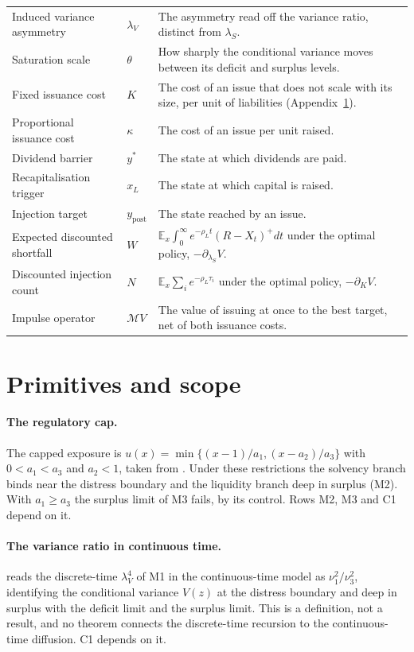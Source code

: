 \begin{longtable}{@{}P{3.4cm}P{4.2cm}P{8.6cm}@{}}
Induced variance asymmetry & $\lambda_V$ & The asymmetry read off the variance ratio, distinct from $\lambda_S$. \\
Saturation scale & $\theta$ & How sharply the conditional variance moves between its deficit and surplus levels. \\
Fixed issuance cost & $K$ & The cost of an issue that does not scale with its size, per unit of liabilities (Appendix~\ref{app:primitives}). \\
Proportional issuance cost & $\kappa$ & The cost of an issue per unit raised. \\
Dividend barrier & $y^*$ & The state at which dividends are paid. \\
Recapitalisation trigger & $x_L$ & The state at which capital is raised. \\
Injection target & $y_{\text{post}}$ & The state reached by an issue. \\
Expected discounted shortfall & $W$ & $\mathbb E_x\int_0^\infty e^{-\rho_Lt}(R-X_t)^+dt$ under the optimal policy, $-\partial_{\lambda_S}V$. \\
Discounted injection count & $N$ & $\mathbb E_x\sum_ie^{-\rho_L\tau_i}$ under the optimal policy, $-\partial_KV$. \\
Impulse operator & $\mathcal MV$ & The value of issuing at once to the best target, net of both issuance costs. \\
\bottomrule
\end{longtable}
\normalsize

\section{Primitives and scope}
\label{app:primitives}

\paragraph{The regulatory cap.} The capped exposure is
$u(x)=\min\{(x-1)/a_1,(x-a_2)/a_3\}$ with $0<a_1<a_3$ and $a_2<1$, taken from
. Under these restrictions the solvency branch binds near
the distress boundary and the liquidity branch deep in surplus (M2). With
$a_1\ge a_3$ the surplus limit of M3 fails, by its control. Rows M2, M3 and C1
depend on it.

\paragraph{The variance ratio in continuous time.} 
reads the discrete-time $\lambda_V^4$ of M1 in the continuous-time model as
$\nu_1^2/\nu_3^2$, identifying the conditional variance $V(z)$ at the
distress boundary and deep in surplus with the deficit limit and the surplus
limit. This
is a definition, not a result, and no theorem connects the discrete-time
recursion to the continuous-time diffusion. C1 depends on it.

